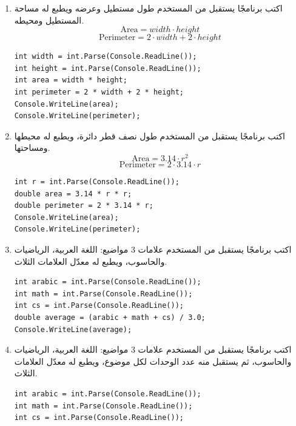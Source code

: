 \documentclass[14pt]{extarticle}
\begin{document}
\begin{enumerate}[itemsep=2em]
\item
اكتب برنامجًا يستقبل من المستخدم طول مستطيل وعرضه ويطبع له مساحة المستطيل ومحيطه.
$$ \text{Area} = width \cdot height $$
$$ \text{Perimeter} = 2 \cdot width + 2 \cdot height $$
\ifwithsols
\begin{boxSolution}
\begin{english}
\begin{verbatim}
int width = int.Parse(Console.ReadLine());
int height = int.Parse(Console.ReadLine());
int area = width * height;
int perimeter = 2 * width + 2 * height;
Console.WriteLine(area);
Console.WriteLine(perimeter);
\end{verbatim}
\end{english}
\end{boxSolution}
\clearpage
\fi

\item
اكتب برنامجًا يستقبل من المستخدم طول نصف قطر دائرة، ويطبع له محيطها ومساحتها.
$$ \text{Area} = 3.14 \cdot r^2 $$
$$ \text{Perimeter} = 2 \cdot 3.14 \cdot r $$
\ifwithsols
\begin{boxSolution}
\begin{english}
\begin{verbatim}
int r = int.Parse(Console.ReadLine());
double area = 3.14 * r * r;
double perimeter = 2 * 3.14 * r;
Console.WriteLine(area);
Console.WriteLine(perimeter);
\end{verbatim}
\end{english}
\end{boxSolution}
\fi

\item
اكتب برنامجًا يستقبل من المستخدم علامات 3 مواضيع: اللغة العربية، الرياضيات والحاسوب، ويطبع له معدّل العلامات الثلاث.
\ifwithsols
\begin{boxSolution}
\begin{english}
\begin{verbatim}
int arabic = int.Parse(Console.ReadLine());
int math = int.Parse(Console.ReadLine());
int cs = int.Parse(Console.ReadLine());
double average = (arabic + math + cs) / 3.0;
Console.WriteLine(average);
\end{verbatim}
\end{english}
\end{boxSolution}
\clearpage
\fi

\item
اكتب برنامجًا يستقبل من المستخدم علامات 3 مواضيع: اللغة العربية، الرياضيات والحاسوب، ثم يستقبل منه عدد الوحدات لكل موضوع، ويطبع له معدّل العلامات الثلاث.
\ifwithsols
\begin{boxSolution}
\begin{english}
\begin{verbatim}
int arabic = int.Parse(Console.ReadLine());
int math = int.Parse(Console.ReadLine());
int cs = int.Parse(Console.ReadLine());


\end{verbatim}
\end{english}
\end{boxSolution}
\end{enumerate}
\end{document}
